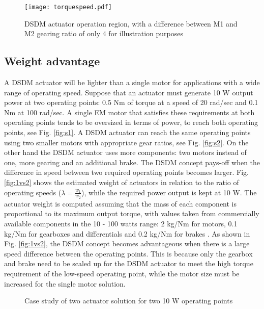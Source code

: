 \begin{figure}[H]
	\centering
		\texttt{[image: torquespeed.pdf]}
	\caption{DSDM actuator operation region, with a difference between M1 and M2 gearing ratio of only 4 for illustration purposes }
	\label{fig:torquespeed}
\end{figure}

\subsection{Weight advantage}
\label{sec:WeightAdvantage}


A DSDM actuator will be lighter than a single motor for applications with a wide range of operating speed. Suppose that an actuator must generate 10 W output power at two operating points: 0.5 Nm of torque at a speed of 20 rad/sec and 0.1 Nm at 100 rad/sec. A single EM motor that satisfies these requirements at both operating points tends to be oversized in terms of power, to reach both operating points, see Fig. \ref{fig:s1}. A DSDM actuator can reach the same operating points using two smaller motors with appropriate gear ratios, see Fig. \ref{fig:s2}. On the other hand the DSDM actuator uses more components: two motors instead of one, more gearing and an additional brake. The DSDM concept pays-off when the difference in speed between two required operating points becomes larger.  Fig. \ref{fig:1vs2} shows the estimated weight of actuators in relation to the ratio of operating speeds ($\lambda=\frac{w_1}{w_2}$), while the required power output is kept at 10 W. The actuator weight is computed assuming that the mass of each component is proportional to its maximum output torque, with values taken from commercially available components in the 10 - 100 watts range: 2 kg/Nm for motors, 0.1 kg/Nm for gearboxes and differentials and 0.2 kg/Nm for brakes \cite{maxon_motor_usa}. As shown in Fig. \ref{fig:1vs2}, the DSDM concept becomes advantageous when there is a large speed difference between the operating points. This is because only the gearbox and brake need to be scaled up for the DSDM actuator to meet the high torque requirement of the low-speed operating point, while the motor size must be increased for the single motor solution.



\begin{figure}[H]
        \centering
        \caption{Case study of two actuator solution for two 10 W operating points }\label{fig:solutions}
\end{figure}

